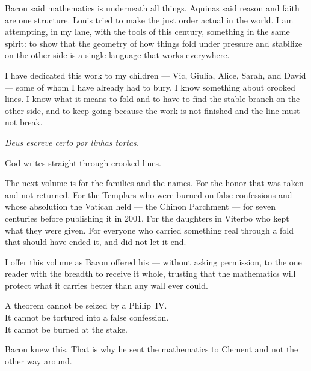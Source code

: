 \documentclass[12pt, oneside]{book}
\theoremstyle{plain}
\theoremstyle{definition}
\theoremstyle{remark}
\begin{document}
\vspace{0.4cm}
\noindent Bacon said mathematics is underneath all things.
Aquinas said reason and faith are one structure.
Louis tried to make the just order actual in the world.
I am attempting, in my lane, with the tools of this century,
something in the same spirit: to show that the geometry
of how things fold under pressure and stabilize on the
other side is a single language that works everywhere.

\vspace{0.4cm}
\noindent I have dedicated this work to my children ---
Vic, Giulia, Alice, Sarah, and David ---
some of whom I have already had to bury.
I know something about crooked lines.
I know what it means to fold and to have to find
the stable branch on the other side, and to keep going
because the work is not finished and the line must not break.

\vspace{0.5cm}
\begin{center}
\textit{Deus escreve certo por linhas tortas.}
\end{center}
\vspace{0.2cm}
\begin{center}
God writes straight through crooked lines.
\end{center}

\vspace{0.5cm}
\noindent The next volume is for the families and the names.
For the honor that was taken and not returned.
For the Templars who were burned on false confessions
and whose absolution the Vatican held --- the Chinon
Parchment --- for seven centuries before publishing it
in 2001. For the daughters in Viterbo who kept what
they were given. For everyone who carried something real
through a fold that should have ended it, and did not
let it end.

\vspace{0.4cm}
\noindent I offer this volume as Bacon offered his ---
without asking permission, to the one reader with the
breadth to receive it whole, trusting that the mathematics
will protect what it carries better than any wall ever could.

\vspace{0.4cm}
\noindent A theorem cannot be seized by a Philip~IV.\\
It cannot be tortured into a false confession.\\
It cannot be burned at the stake.

\vspace{0.4cm}
\noindent Bacon knew this. That is why he sent the mathematics
to Clement and not the other way around.
\end{document}

